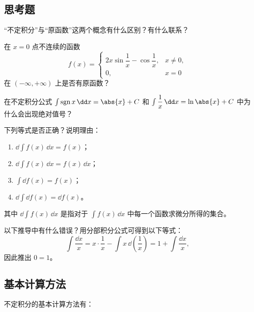 \subsection{思考题}

\begin{xthought}[1]
“不定积分”与“原函数”这两个概念有什么区别？有什么联系？
\end{xthought}

\begin{xthought}[2]
在 $x=0$ 点不连续的函数
  \[
    f(x)=
    \begin{cases}
      2x\sin\dfrac1x-\cos\dfrac1x, & x\ne0,\\
      0, & x=0
    \end{cases}
  \]
  在 $(-\infty,+\infty)$ 上是否有原函数？
\end{xthought}

\begin{xthought}[3]
在不定积分公式 $\int \operatorname{sgn}x\,\dd x=\abs{x}+C$ 和 $\int\dfrac1x\,\dd x=\ln\abs{x}+C$ 中为什么会出现绝对值号？
\end{xthought}

\begin{xthought}[4]
下列等式是否正确？说明理由：
  \begin{enumerate}[label=(\arabic*)]
    \item $\dd\int f(x)\,\dd x=f(x)$；
    \item $\dd\int f(x)\,\dd x=f(x)\,\dd x$；
    \item $\int\dd f(x)=f(x)$；
    \item $\dd\int\dd f(x)=\dd f(x)$。
  \end{enumerate}
  其中 $\dd\int f(x)\,\dd x$ 是指对于 $\int f(x)\,\dd x$ 中每一个函数求微分所得的集合。
\end{xthought}

\begin{xthought}[5]
以下推导中有什么错误？用分部积分公式可得到以下等式：
  \[
    \int\frac{\dd x}{x}
      =x\cdot\frac1x-\int x\,\dd\left(\frac1x\right)
      =1+\int\frac{\dd x}{x},
  \]
  因此推出 $0=1$。
\end{xthought}

\subsection{基本计算方法}

不定积分的基本计算方法有：

